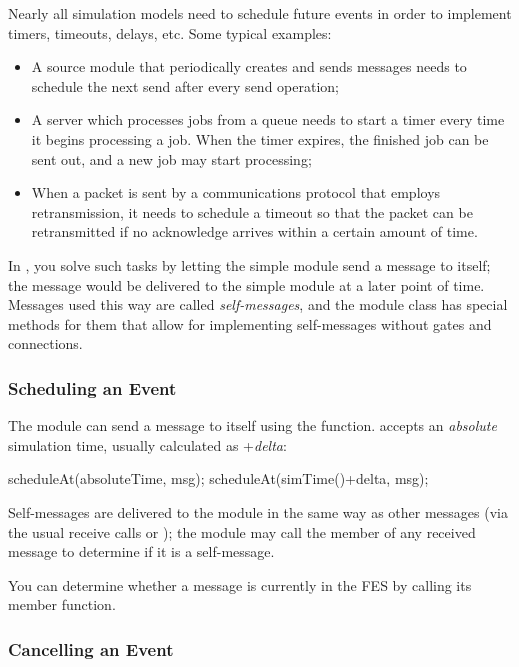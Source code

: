 Nearly all simulation models need to schedule future events in order
to implement timers, timeouts, delays, etc. Some typical examples:

\begin{itemize}
  \item A source module that periodically creates and sends messages
    needs to schedule the next send after every send operation;
  \item A server which processes jobs from a queue needs to start
    a timer every time it begins processing a job. When the timer
    expires, the finished job can be sent out, and a new job may
    start processing;
  \item When a packet is sent by a communications protocol that employs
    retransmission, it needs to schedule a timeout so that the packet
    can be retransmitted if no acknowledge arrives within a certain
    amount of time.
\end{itemize}

In {\opp}, you solve such tasks by letting the simple module send a message
to itself; the message would be delivered to the simple module at a later
point of time. Messages used this way are called
\textit{self-messages}, and the module class has
special methods for them that allow for implementing self-messages without
gates and connections.

\subsubsection{Scheduling an Event}

The module can send a message to itself using the  function.
 accepts an \textit{absolute} simulation time,
usually calculated as +\textit{delta}:

\begin{cpp}
scheduleAt(absoluteTime, msg);
scheduleAt(simTime()+delta, msg);
\end{cpp}

Self-messages are delivered to the module in the same way as other
messages (via the usual receive calls or );
the module may call the  member of any received
message to determine if it is a self-message.

You can determine whether a message is currently in the FES
by calling its  member function.

\subsubsection{Cancelling an Event}

